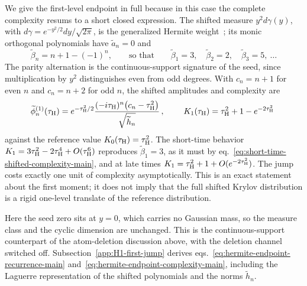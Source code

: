 \documentclass[a4paper,11pt]{article}
\def\dd{d}%
\def\ii{i}%
\def\ee{e}%
\theoremstyle{definition}
\theoremstyle{remark}
\newcommand{\dd}{\mathrm d}
\newcommand{\ii}{\mathrm i}
\newcommand{\ee}{\mathrm e}
\newcommand{\tphi}{\widetilde\phi}
\newcommand{\thh}{\widetilde h}
\begin{document}
We give the first-level endpoint in full because in this case the complete
complexity resums to a short closed expression.
The shifted measure $y^2\dd\gamma(y)$, with
$\dd\gamma=\ee^{-y^2/2}\dd y/\sqrt{2\pi}$, is the generalized Hermite weight~\cite{Rosenblum1994}; its monic
orthogonal polynomials have $\widetilde a_n=0$ and
\begin{equation}
   \widetilde\beta_n=n+1-(-1)^n,
   \qquad\text{so that}\qquad
   \widetilde\beta_1=3,\quad\widetilde\beta_2=2,\quad\widetilde\beta_3=5,\ \ldots
   \label{eq:hermite-endpoint-recurrence-main}
\end{equation}
The parity alternation is the continuous-support signature of the seed, since multiplication by $y^2$
distinguishes even from odd degrees. With $c_n=n+1$ for even $n$ and $c_n=n+2$ for odd $n$, the
shifted amplitudes and complexity are
\begin{equation}
   \tphi_n^{(1)}(\tau_{\rm H})
   =\ee^{-\tau_{\rm H}^2/2}
    \frac{(-\ii\tau_{\rm H})^n\bigl(c_n-\tau_{\rm H}^2\bigr)}{\sqrt{\thh_n}}\,,
   \qquad
   \;K_1(\tau_{\rm H})=\tau_{\rm H}^2+1-\ee^{-2\tau_{\rm H}^2}\;
   \label{eq:hermite-endpoint-complexity-main}
\end{equation}
against the reference value $K_0(\tau_{\rm H})=\tau_{\rm H}^2$. The short-time behavior
$K_1=3\tau_{\rm H}^2-2\tau_{\rm H}^4+O(\tau_{\rm H}^6)$ reproduces
$\widetilde\beta_1=3$, as it must by
eq.~\eqref{eq:short-time-shifted-complexity-main}, and at late times
$K_1=\tau_{\rm H}^2+1+O(\ee^{-2\tau_{\rm H}^2})$.  The jump costs exactly one unit of complexity
asymptotically.  This is an exact statement about the first moment; it does not imply that
the full shifted Krylov distribution is a rigid one-level translate of the reference distribution.

Here the seed zero sits at $y=0$, which carries no Gaussian mass, so the measure class and the
cyclic dimension are unchanged. This is the continuous-support counterpart of the atom-deletion
discussion above, with the deletion channel switched off. Subsection~\ref{app:H1-first-jump}
derives eqs.~\eqref{eq:hermite-endpoint-recurrence-main}
and~\eqref{eq:hermite-endpoint-complexity-main}, including the Laguerre representation of the
shifted polynomials and the norms $\thh_n$. 
\end{document}
